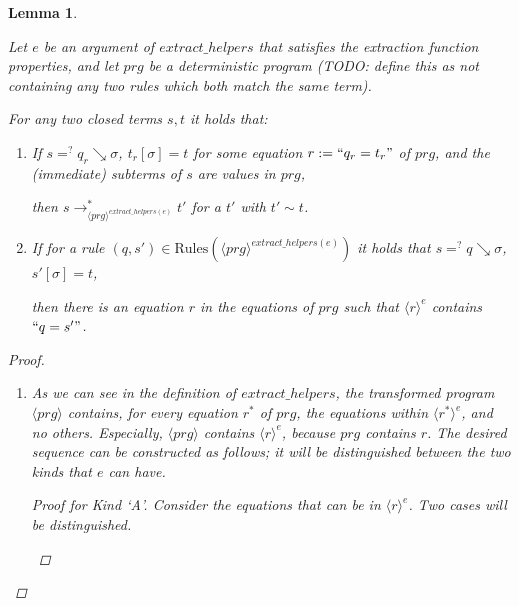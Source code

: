 \documentclass[11pt]{article} %
\newtheorem{lemma}{Lemma}
\begin{document}
\begin{lemma}
\label{lemma2}

Let $e$ be an argument of $extract\_helpers$ that satisfies the extraction function properties, and let $prg$ be a deterministic program (TODO: define this as not containing any two rules which both match the same term).

For any two closed terms $s,t$ it holds that:

\begin{enumerate}

\item If $s =^? q_r \searrow \sigma$, $t_r[\sigma] = t$ for some equation $r := `` q_r = t_r "$ of $prg$, and the (immediate) subterms of $s$ are values in $prg$,

then $s \longrightarrow^*_{\langle prg \rangle^{extract\_helpers(e)}} t'$ for a $t'$ with $t' \sim t$.

\item If for a rule $(q, s') \in \textrm{Rules}(\langle prg \rangle^{extract\_helpers(e)})$ it holds that $s =^? q \searrow \sigma$, $s'[\sigma] = t$,

then there is an equation $r$ in the equations of $prg$ such that $\langle r \rangle^e$ contains $`` q = s' "$.

\end{enumerate}

\begin{proof}

\begin{enumerate}

\item

As we can see in the definition of $extract\_helpers$, the transformed program $\langle prg \rangle$ contains, for every equation $r^*$ of $prg$, the equations within $\langle r^* \rangle^e$, and no others. Especially, $\langle prg \rangle$ contains $\langle r \rangle^e$, because $prg$ contains $r$. The desired sequence can be constructed as follows; it will be distinguished between the two kinds that $e$ can have.

\begin{proof}[Proof for Kind `A'] Consider the equations that can be in $\langle r \rangle^e$. Two cases will be distinguished.

\begin{itemize}


\end{itemize}
\end{proof}
\end{enumerate}
\end{proof}
\end{lemma}
\end{document}
